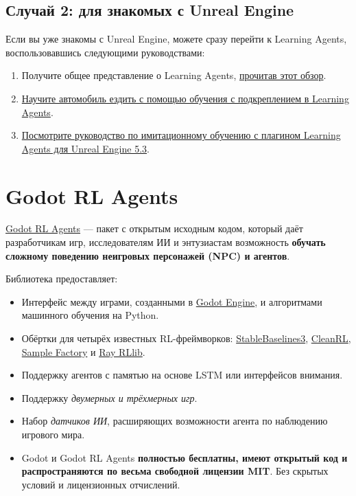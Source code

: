 \documentclass[11pt,a4paper]{article}
\begin{document}
\subsection{Случай 2: для знакомых с Unreal Engine}\label{case-2-im-familiar-with-unreal}

Если вы уже знакомы с Unreal Engine, можете сразу перейти к Learning Agents, воспользовавшись следующими руководствами:

\begin{enumerate}
\def\labelenumi{\arabic{enumi}.}
\item
  Получите общее представление о Learning Agents, \href{https://dev.epicgames.com/community/learning/tutorials/8OWY/unreal-engine-learning-agents-introduction}{прочитав этот обзор}.
\item
  \href{https://dev.epicgames.com/community/learning/tutorials/qj2O/unreal-engine-learning-to-drive}{Научите автомобиль ездить с помощью обучения с подкреплением в Learning Agents}.
\item
  \href{https://www.youtube.com/watch?v=NwYUNlFvajQ}{Посмотрите руководство по имитационному обучению с плагином Learning Agents для Unreal Engine 5.3}.
\end{enumerate}

\section{Godot RL Agents}\label{godot-rl-agents}

\href{https://github.com/edbeeching/godot_rl_agents}{Godot RL Agents} --- пакет с открытым исходным кодом, который даёт разработчикам игр, исследователям ИИ и энтузиастам возможность \textbf{обучать сложному поведению неигровых персонажей (NPC) и агентов}.

Библиотека предоставляет:

\begin{itemize}
\item
  Интерфейс между играми, созданными в \href{https://godotengine.org/}{Godot Engine}, и алгоритмами машинного обучения на Python.
\item
  Обёртки для четырёх известных RL-фреймворков: \href{https://stable-baselines3.readthedocs.io/en/master/}{StableBaselines3}, \href{https://docs.cleanrl.dev/}{CleanRL}, \href{https://www.samplefactory.dev/}{Sample Factory} и \href{https://docs.ray.io/en/latest/rllib-algorithms.html}{Ray RLlib}.
\item
  Поддержку агентов с памятью на основе LSTM или интерфейсов внимания.
\item
  Поддержку \emph{двумерных и трёхмерных игр}.
\item
  Набор \emph{датчиков ИИ}, расширяющих возможности агента по наблюдению игрового мира.
\item
  Godot и Godot RL Agents \textbf{полностью бесплатны, имеют открытый код и распространяются по весьма свободной лицензии MIT}. Без скрытых условий и лицензионных отчислений.
\end{itemize}
\end{document}
